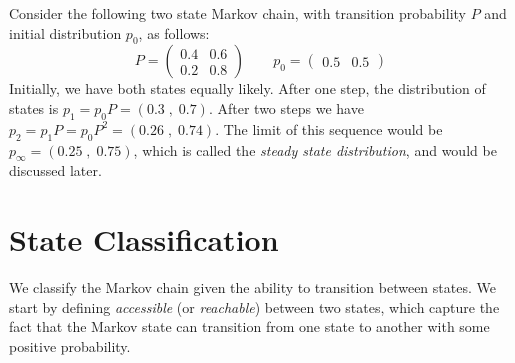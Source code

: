 \begin{example}
Consider the
following two state Markov chain, with transition probability $P$
and initial distribution $p_0$, as follows:
$$
P=
\begin{pmatrix}
0.4 & 0.6  \\
0.2 & 0.8
\end{pmatrix}
\qquad p_0=
\begin{pmatrix}
0.5  & 0.5
\end{pmatrix}
$$
Initially, we have both states equally likely. After one step, the
distribution of states is $p_1=p_0 P=(0.3\;,\; 0.7)$. After two
steps we have $p_2=p_1 P=p_0 P^2 = (0.26 \;,\; 0.74 )$. The limit of
this sequence would be $p_\infty =(0.25 \;,\; 0.75)$, which is
called the {\em steady state distribution}, and would be discussed
later.
\end{example}

\section{State Classification}

We classify the Markov chain given the ability to transition between states. We start by defining \textit{accessible} (or \textit{reachable}) between two states, which capture the fact that the Markov state can transition from one state to another with some positive probability.

